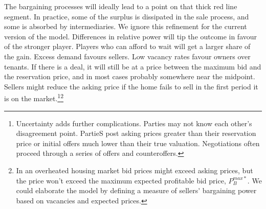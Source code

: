 {The bargaining processes will ideally lead to a point on that thick red line segment. In practice, some of the surplus is dissipated in the sale process, and some is absorbed by intermediaries. We ignore this refinement for the current version of the model. Differences in relative power will tip the outcome in favour of the stronger player.   Players who can afford to wait will get a larger share of the gain. Excess demand favours sellers. Low vacancy rates favour owners over tenants.   If there is a deal, it will still be at a price between the maximum bid and the reservation price, and in most cases probably somewhere near the midpoint. Sellers might reduce the asking price if the home fails to sell in the first period it is on the market.\footnote{Uncertainty adds further complications. Parties may not know each other's disagreement point. PartieS post asking prices greater than their reservation price or initial offers much lower than their true valuation.  
Negotiations often proceed through a series of offers and counteroffers.}\;\footnote{In an overheated housing market bid prices might exceed asking prices, but the price won't exceed the maximum expected profitable bid price, $P_B^{max*}$. We could elaborate the model by defining a measure of \gls{sellers' bargaining power} based on vacancies and expected prices.}   %


 




}
